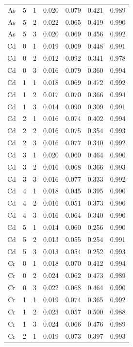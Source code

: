 \documentclass[ms, hidelinks]{uncgdissertationexp}
\theoremstyle{plain}
\theoremstyle{definition}
\theoremstyle{remark}
\begin{document}
\begin{longtable}{ccccccc}
As & 5 & 1 & 0.020 & 0.079 & 0.421 & 0.989\\
\rowcolor{gray!6}  As & 5 & 2 & 0.022 & 0.065 & 0.419 & 0.990\\
As & 5 & 3 & 0.020 & 0.069 & 0.456 & 0.992\\
\rowcolor{gray!6}  Cd & 0 & 1 & 0.019 & 0.069 & 0.448 & 0.991\\
Cd & 0 & 2 & 0.012 & 0.092 & 0.341 & 0.978\\
\rowcolor{gray!6}  Cd & 0 & 3 & 0.016 & 0.079 & 0.360 & 0.994\\
Cd & 1 & 1 & 0.018 & 0.069 & 0.472 & 0.992\\
\rowcolor{gray!6}  Cd & 1 & 2 & 0.017 & 0.070 & 0.366 & 0.994\\
Cd & 1 & 3 & 0.014 & 0.090 & 0.309 & 0.991\\
\rowcolor{gray!6}  Cd & 2 & 1 & 0.016 & 0.074 & 0.402 & 0.994\\
Cd & 2 & 2 & 0.016 & 0.075 & 0.354 & 0.993\\
\rowcolor{gray!6}  Cd & 2 & 3 & 0.016 & 0.077 & 0.340 & 0.992\\
Cd & 3 & 1 & 0.020 & 0.060 & 0.464 & 0.990\\
\rowcolor{gray!6}  Cd & 3 & 2 & 0.016 & 0.068 & 0.366 & 0.993\\
Cd & 3 & 3 & 0.016 & 0.077 & 0.333 & 0.992\\
\rowcolor{gray!6}  Cd & 4 & 1 & 0.018 & 0.045 & 0.395 & 0.990\\
Cd & 4 & 2 & 0.016 & 0.051 & 0.373 & 0.990\\
\rowcolor{gray!6}  Cd & 4 & 3 & 0.016 & 0.064 & 0.340 & 0.990\\
Cd & 5 & 1 & 0.014 & 0.060 & 0.256 & 0.990\\
\rowcolor{gray!6}  Cd & 5 & 2 & 0.013 & 0.055 & 0.254 & 0.991\\
Cd & 5 & 3 & 0.013 & 0.054 & 0.252 & 0.993\\
\rowcolor{gray!6}  Cr & 0 & 1 & 0.018 & 0.070 & 0.412 & 0.994\\
Cr & 0 & 2 & 0.024 & 0.062 & 0.473 & 0.989\\
\rowcolor{gray!6}  Cr & 0 & 3 & 0.022 & 0.068 & 0.464 & 0.990\\
Cr & 1 & 1 & 0.019 & 0.074 & 0.365 & 0.992\\
\rowcolor{gray!6}  Cr & 1 & 2 & 0.023 & 0.057 & 0.500 & 0.988\\
Cr & 1 & 3 & 0.024 & 0.066 & 0.476 & 0.989\\
\rowcolor{gray!6}  Cr & 2 & 1 & 0.019 & 0.073 & 0.397 & 0.993\\

\end{longtable}
\end{document}
